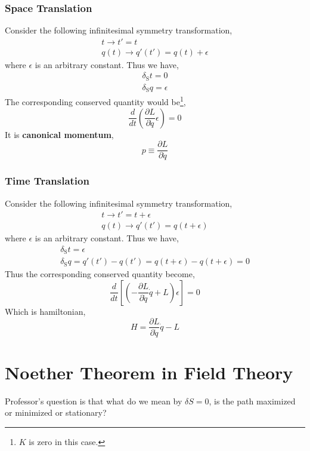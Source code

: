 \documentclass[12pt]{article}
\numberwithin{equation}{section}
\begin{document}
\subsubsection{Space Translation}
Consider the following infinitesimal symmetry transformation,
\begin{equation}
    \begin{split}
        t\rightarrow t' = t\\
        q(t)\rightarrow q'(t') = q(t) + \epsilon
    \end{split}
\end{equation}
where $\epsilon$ is an arbitrary constant.
Thus we have,
\begin{equation}
    \begin{split}
        \delta_{\text{S}}t =0\\
        \delta_{\text{S}}q = \epsilon
    \end{split}
\end{equation}
The corresponding conserved quantity would be\footnote{$K$ is zero in this case.},
\begin{equation}
    \frac{d}{dt}\left(\frac{\partial L}{\partial\dot{q}}\epsilon\right) = 0
\end{equation}
It is \textbf{canonical momentum},
\begin{equation}
    p\equiv\frac{\partial L}{\partial\dot{q}}
\end{equation}
\subsubsection{Time Translation}
Consider the following infinitesimal symmetry transformation,
\begin{equation}
    \begin{split}
        t\rightarrow t' = t+\epsilon\\
        q(t)\rightarrow q'(t') = q(t+\epsilon)
    \end{split}
\end{equation}
where $\epsilon$ is an arbitrary constant. Thus we have,
\begin{equation}
    \begin{split}
        \delta_{\text{S}}t = \epsilon\\
        \delta_{\text{S}}q = q'(t')-q(t') = q(t+\epsilon)-q(t+\epsilon) = 0
    \end{split}
\end{equation}
Thus the corresponding conserved quantity become,
\begin{equation}
    \frac{d}{dt}\left[\left(-\frac{\partial L}{\partial\dot{q}}\dot{q}+L\right)\epsilon\right] = 0
\end{equation}
Which is hamiltonian,
\begin{equation}
    H = \frac{\partial L}{\partial\dot{q}}\dot{q}-L
\end{equation}

\section{Noether Theorem in Field Theory}
Professor's question is that what do we mean by $\delta S = 0$, is the path maximized or minimized or stationary?
\end{document}
